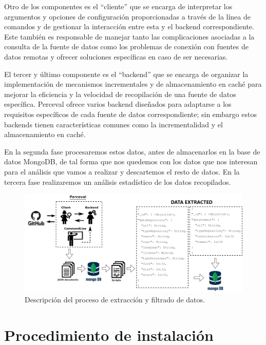 \documentclass[a4paper, 12pt]{book}
\begin{document}
Otro de los componentes es el ``cliente'' que se encarga de interpretar los argumentos y opciones de configuración proporcionadas a través de la línea de comandos y de gestionar la interacción entre esta y el backend correspondiente.
Este también es responsable de manejar tanto las complicaciones asociadas a la consulta de la fuente de datos como los problemas de conexión con fuentes de datos remotas y ofrecer soluciones específicas en caso de ser necesarias.
 

El tercer y último componente es el ``backend'' que se encarga de organizar la implementación de mecanismos incrementales y de almacenamiento en caché para mejorar la eficiencia y la velocidad de recopilación de una fuente de datos específica.
Perceval ofrece varios backend diseñados para adaptarse a los requisitos específicos de cada fuente de datos correspondiente; sin embargo estos backends tienen características comunes como la incrementalidad y el almacenamiento en caché.


En la segunda fase procesaremos estos datos, antes de almacenarlos en la base de datos MongoDB, de tal forma que nos quedemos con los datos que nos interesan para el análisis que vamos a realizar y descartemos el resto de datos.
En la tercera fase realizaremos un análisis estadístico de los datos recopilados. 

\begin{figure}
  \centering
  \includegraphics[width=16cm, keepaspectratio]{img/Arquitectura_general.png}
  \caption{Descripción del proceso de extracción y filtrado de datos.}\label{fig:arquitectura}
\end{figure}


\section{Procedimiento de instalación} %
\label{sec:procedimiento de instalación}
\end{document}
